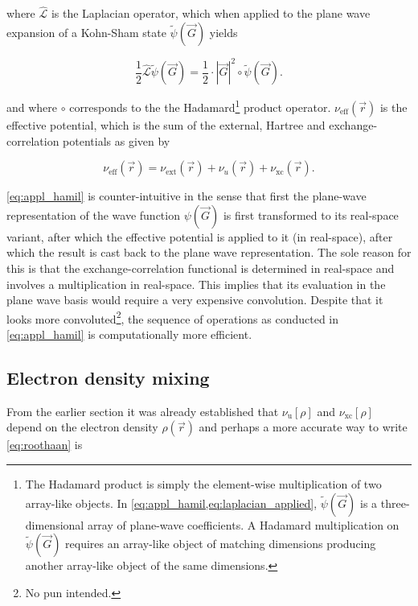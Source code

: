 where $\hat{\mathcal{L}}$ is the Laplacian operator, which when applied to the plane wave expansion of a Kohn-Sham state $\tilde{\psi}(\vec{G})$ yields

\begin{equation}
    \frac{1}{2} \hat{\mathcal{L}}\tilde{\psi}(\vec{G}) = \frac{1}{2} \cdot |\vec{G}|^{2} \circ \tilde{\psi}(\vec{G}).
    \label{eq:laplacian_applied}
\end{equation}

and where $\circ$ corresponds to the the Hadamard\footnote{The Hadamard product is simply the element-wise multiplication of two array-like objects. In \cref{eq:appl_hamil,eq:laplacian_applied}, $\tilde{\psi}(\vec{G})$ is a three-dimensional array of plane-wave coefficients. A Hadamard multiplication on $\tilde{\psi}(\vec{G})$ requires an array-like object of matching dimensions producing another array-like object of the same dimensions.} product operator. $\nu_{\text{eff}}(\vec{r})$ is the effective potential, which is the sum of the external, Hartree and exchange-correlation potentials as given by

\begin{equation}
    \nu_{\text{eff}}(\vec{r}) = \nu_{\text{ext}}(\vec{r}) + \nu_{u}(\vec{r}) + \nu_{\text{xc}}(\vec{r}).
\end{equation}

\cref{eq:appl_hamil} is counter-intuitive in the sense that first the plane-wave representation of the wave function $\psi(\vec{G})$ is first transformed to its real-space variant, after which the effective potential is applied to it (in real-space), after which the result is cast back to the plane wave representation. The sole reason for this is that the exchange-correlation functional is determined in real-space and involves a multiplication in real-space. This implies that its evaluation in the plane wave basis would require a very expensive convolution. Despite that it looks more convoluted\footnote{No pun intended.}, the sequence of operations as conducted in \cref{eq:appl_hamil} is computationally more efficient.

%
%
%
\subsection{Electron density mixing}

From the earlier section it was already established that $\nu_{\text{u}}[\rho]$ and $\nu_{\text{xc}}[\rho]$ depend on the electron density $\rho(\vec{r})$ and perhaps a more accurate way to write \cref{eq:roothaan} is

